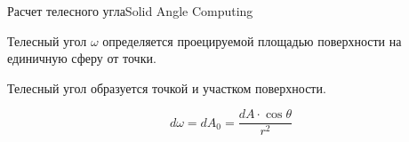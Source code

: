 \documentclass{beamer}
\begin{document}
	\begin{frame}{Расчет телесного угла}{Solid Angle Computing}
		
		Телесный угол $\omega$ определяется проецируемой площадью поверхности на единичную сферу от точки.

		Телесный угол образуется точкой и участком поверхности.

		\[
			d \omega = d A_0 = \frac{d A \cdot \cos \theta}{ r^2}
		\]

	\end{frame}
\end{document}
